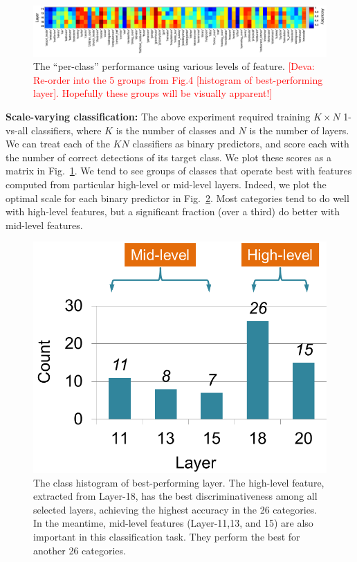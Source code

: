 \documentclass[10pt,twocolumn,letterpaper]{article}
\newcommand{\deva}[1]{\textcolor{red}{[Deva: #1]}}
\begin{document}
\begin{figure}[ht!]
\centering
	\includegraphics[width=1\textwidth]{fig/fig_level_perf.png}
\caption{The ``per-class'' performance using various levels of feature. \deva{Re-order into the 5 groups from Fig.4 [histogram of best-performing layer]. Hopefully these groups will be visually apparent!} }
\label{fig:level_perf}
\end{figure}


{\bf Scale-varying classification:} The above experiment required training $K \times N$ 1-vs-all classifiers, where $K$ is the number of classes and $N$ is the number of layers. We can treat each of the $KN$ classifiers as binary predictors, and score each with the number of correct detections of its target class. We plot these scores as a matrix in Fig.~\ref{fig:level_perf}. We tend to see groups of classes that operate best with features computed from particular high-level or mid-level layers. Indeed, we plot the optimal scale for each binary predictor in Fig.~\ref{fig:best_perf_layer_hist}. Most categories tend to do well with high-level features, but a significant fraction (over a third) do better with mid-level features.

\begin{figure}[htbp]
\centering
	\includegraphics[width=.6\columnwidth]{fig/best_perf_layer_hist.png}
\caption{The class histogram of best-performing layer. The high-level feature, extracted from Layer-18,  has the best discriminativeness among all selected layers, achieving the highest accuracy in the 26 categories. In the meantime, mid-level features (Layer-11,13, and 15) are also important in this classification task. They perform the best for another 26 categories. }
\label{fig:best_perf_layer_hist}
\end{figure}
\end{document}
